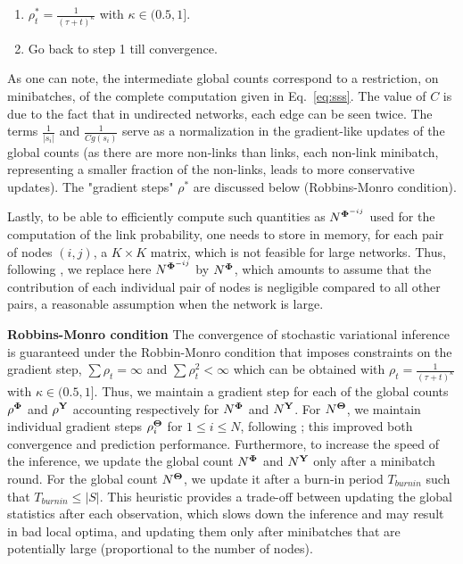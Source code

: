\begin{enumerate}
\item $\rho^*_t = \frac{1}{(\tau +t)^\kappa}$ with $\kappa \in (0.5, 1]$.
\item Go back to step 1 till convergence.
\end{enumerate}
%
As one can note, the intermediate global counts correspond to a restriction, on minibatches, of the complete computation given in Eq.~\ref{eq:sss}. The value of $C$ is due to the fact that in undirected networks, each edge can be seen twice. The terms $\frac{1}{|s_i|}$ and $\frac{1}{Cg(s_i)}$ serve as a normalization in the gradient-like updates of the global counts (as there are more non-links than links, each non-link minibatch, representing a smaller fraction of the non-links, leads to more conservative updates). The "gradient steps" $\rho^*$ are discussed below (Robbins-Monro condition).

Lastly, to be able to efficiently compute such quantities as $N^{{\boldsymbol{\Phi}}^{-ij}}$ used for the computation of the link probability, one needs to store in memory, for each pair of nodes $(i,j)$, a $K \times K$ matrix, which is not feasible for large networks. Thus, following \cite{foulds2013stochastic}, we replace here $N^{{\boldsymbol{\Phi}}^{-ij}}$ by $N^{{\boldsymbol{\Phi}}}$, which amounts to assume that the contribution of each individual pair of nodes is negligible compared to all other pairs, a reasonable assumption when the network is large. %

\textbf{Robbins-Monro condition} The convergence of stochastic variational inference is guaranteed under the Robbin-Monro condition \cite{robbins1951stochastic} that imposes constraints on the gradient step, $\sum \rho_t = \infty$ and $\sum \rho_t^2 < \infty$ which can be obtained with $\rho_t = \frac{1}{(\tau +t)^\kappa}$ with $\kappa \in (0.5, 1]$. Thus, we maintain a gradient step for each of the global counts $\rho^{\boldsymbol{\Phi}}$ and $\rho^{\mathbf{Y}}$ accounting respectively for  $N^{\boldsymbol{\Phi}}$ and $N^{\mathbf{Y}}$. For $N^{\boldsymbol{\Theta}}$, we maintain individual gradient steps $\rho_i^{{\boldsymbol{\Theta}}}$ for $1\leq i\leq N$, following \cite{miller2009nonparametric}; this improved both convergence and prediction performance. Furthermore, to increase the speed of the inference, we update the global count $N^{\boldsymbol{\Phi}}$ and $N^{\mathbf{Y}}$ only after a minibatch round. For the global count  $N^{\boldsymbol{\Theta}}$, we update it after a burn-in period $T_{burnin}$ such that $T_{burnin} \leq |S|$.
This heuristic provides a trade-off between updating the global statistics after each observation, which slows down the inference and may result in bad local optima, and updating them only after minibatches that are potentially large (proportional to the number of nodes).

